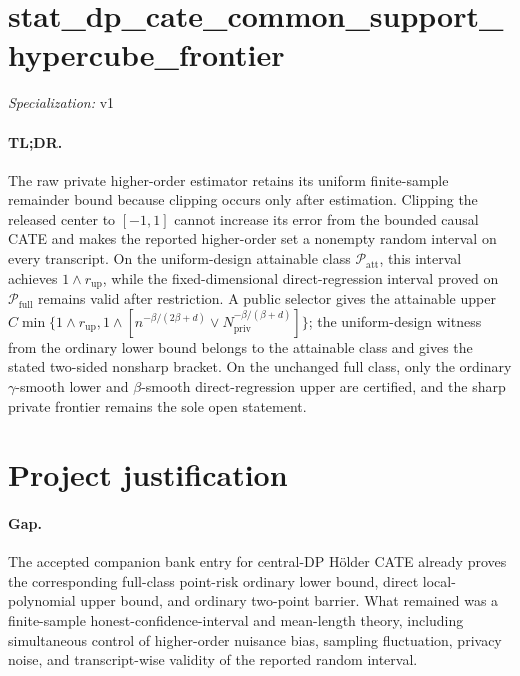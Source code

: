 \documentclass{article}
\begin{document}
\sloppy

\section*{stat\_\allowbreak{}dp\_\allowbreak{}cate\_\allowbreak{}common\_\allowbreak{}support\_\allowbreak{}hypercube\_\allowbreak{}frontier}

\noindent\textit{Specialization:} v1\par

\paragraph{TL;DR.} The raw private higher-order estimator retains its uniform finite-sample remainder bound because clipping occurs only after estimation.  Clipping the released center to \([-1,1]\) cannot increase its error from the bounded causal CATE and makes the reported higher-order set a nonempty random interval on every transcript.  On the uniform-design attainable class \(\mathcal P_{\mathrm{att}}\), this interval achieves \(1\wedge r_{\mathrm{up}}\), while the fixed-dimensional direct-regression interval proved on \(\mathcal P_{\mathrm{full}}\) remains valid after restriction.  A public selector gives the attainable upper \(C\min\{1\wedge r_{\mathrm{up}},1\wedge[n^{-\beta/(2\beta+d)}\vee N_{\mathrm{priv}}^{-\beta/(\beta+d)}]\}\); the uniform-design witness from the ordinary lower bound belongs to the attainable class and gives the stated two-sided nonsharp bracket.  On the unchanged full class, only the ordinary \(\gamma\)-smooth lower and \(\beta\)-smooth direct-regression upper are certified, and the sharp private frontier remains the sole open statement.

\section{Project justification}

\paragraph{Gap.} The accepted companion bank entry for central-DP Hölder CATE already proves the corresponding full-class point-risk ordinary lower bound, direct local-polynomial upper bound, and ordinary two-point barrier.  What remained was a finite-sample honest-confidence-interval and mean-length theory, including simultaneous control of higher-order nuisance bias, sampling fluctuation, privacy noise, and transcript-wise validity of the reported random interval.
\end{document}
